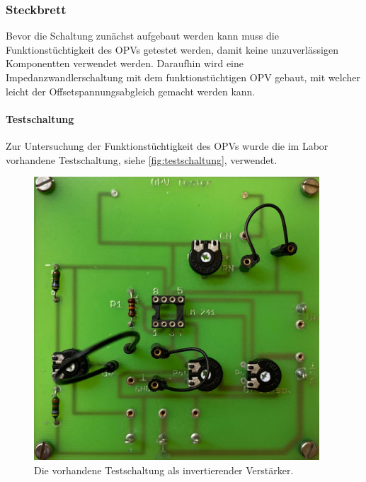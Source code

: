 \documentclass[12pt,english,ngerman]{scrartcl}
\begin{document}
\subsubsection{Steckbrett} \label{sec:elektrometer_steckbrett}
Bevor die Schaltung zunächst aufgebaut werden kann muss die
Funktionstüchtigkeit des OPVs getestet werden, damit keine unzuverlässigen
Komponentten verwendet werden. Daraufhin wird eine Impedanzwandlerschaltung mit
dem funktionstüchtigen OPV gebaut, mit welcher leicht der
Offsetspannungsabgleich gemacht werden kann.


\paragraph{Testschaltung}
Zur Untersuchung der Funktionstüchtigkeit des OPVs wurde die im Labor vorhandene
Testschaltung, siehe \autoref{fig:testschaltung}, verwendet. 

\begin{figure}[H]
  \centering
    \includegraphics[width=0.95\textwidth]{./figures/testschaltung.jpeg}
  \caption{Die vorhandene Testschaltung als invertierender Verstärker.}
  \label{fig:testschaltung}
\end{figure}
\end{document}

